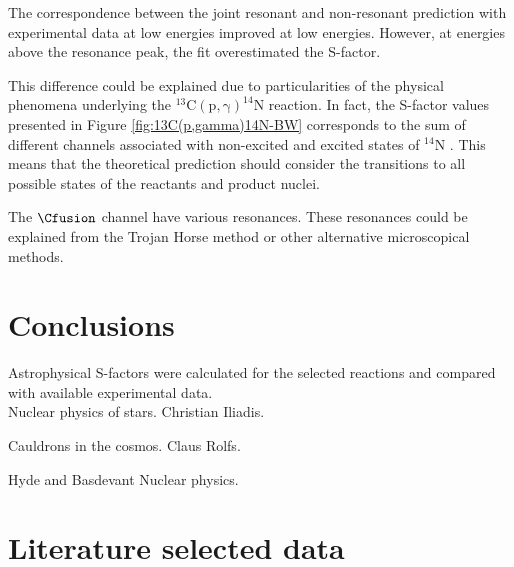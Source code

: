 \documentclass[openany]{book}
\begin{document}
The correspondence between the joint resonant and non-resonant prediction with experimental data at low energies improved at low energies. However, at energies above the resonance peak, the fit overestimated the S-factor. 


This difference could be explained due to particularities of the physical phenomena underlying the $\mathrm{{}^{13}C(p, \gamma)^{14}N}$ reaction. In fact, the S-factor values presented in Figure \ref{fig:13C(p,gamma)14N-BW} corresponds to the sum of different channels associated with non-excited and excited states of  $\mathrm{{}^{14}N}$ \cite{xu_takahashi_goriely_arnould_ohta_utsunomiya_2013}. This means that the theoretical prediction should consider the transitions to all possible states of the reactants and product nuclei.


The $\Cfusion$ channel have various resonances. These resonances could be explained from the Trojan Horse method or other alternative microscopical methods.


\chapter{Conclusions} \label{ch:conclusions}

Astrophysical S-factors were calculated for the selected reactions and compared with available experimental data.  \\

Nuclear physics of stars. Christian Iliadis.

\vspace{1in}
Cauldrons in the cosmos.  Claus Rolfs.

\vspace{1in}
Hyde and Basdevant Nuclear physics.

\appendix

\chapter{Literature selected data} \label{ap:literatureData}
\end{document}
